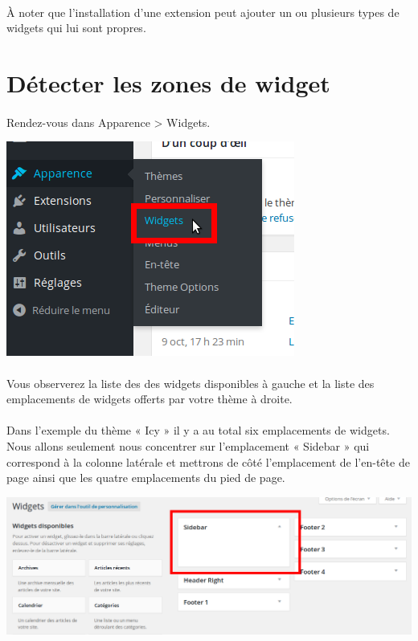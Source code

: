 \documentclass[10pt,a4paper]{article}
\begin{document}
\paragraph{}À noter que l'installation d'une extension peut ajouter un ou plusieurs types de widgets qui lui sont propres.
\section{Détecter les zones de widget}
\paragraph{}Rendez-vous dans Apparence > Widgets.
\begin{center}
\includegraphics[scale=0.3]{img/0252.png}
\end{center}
\paragraph{}Vous observerez la liste des des widgets disponibles à gauche et la liste des emplacements de widgets offerts par votre thème à droite.
\paragraph{}Dans l'exemple du thème « Icy » il y a au total six emplacements de widgets. Nous allons seulement nous concentrer sur l'emplacement « Sidebar » qui correspond à la colonne latérale et mettrons de côté l'emplacement de l'en-tête de page ainsi que les quatre emplacements du pied de page.
\begin{center}
\includegraphics[scale=0.3]{img/0253.png}
\end{center}
\newpage
\end{document}

